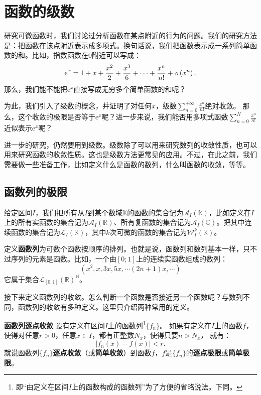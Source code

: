 \documentclass[12pt,UTF8]{ctexbook}
\begin{document}
\chapter{函数的级数}

研究可微函数时，我们讨论过分析函数在某点附近的行为的问题。我们的研究方法是：把函数在该点附近表示成多项式。换句话说，我们把函数表示成一系列简单函数的和。比如，指数函数在$0$附近可以写成：
$$\mathrm{e}^x = 1 + x + \frac{x^2}{2} + \frac{x^3}{6} + \cdots + \frac{x^n}{n!} + \mathit{o}\left(x^n\right).$$
那么，我们能不能把$\mathrm{e}^x$直接写成无穷多个简单函数的和呢？

为此，我们引入了级数的概念，并证明了对任何$x$，级数$\sum_{n=0}^{+\infty}\frac{x^{n}}{n!}$绝对收敛。
那么，这个收敛的极限是否等于$\mathrm{e}^x$呢？进一步来说，我们能否用多项式函数$\sum_{n=0}^N\frac{x^{n}}{n!}$
近似表示$\mathrm{e}^x$呢？

进一步的研究，仍然要用到级数。级数除了可以用来研究数列的收敛性质，也可以用来研究函数的收敛性质。这也是级数方法更常见的应用。不过，在此之前，我们需要做一些准备工作，比如定义什么是函数的数列，什么叫函数的收敛，等等。

\section{函数列的极限}

给定区间$I$，我们把所有从$I$到某个数域$\mathbb{K}$的函数的集合记为$\mathcal{A}_I(\mathbb{K})$，比如定义在$I$上的所有实函数的集合记为$\mathcal{A}_I(\mathbb{R})$、所有复函数的集合记为$\mathcal{A}_I(\mathbb{C})$。把其中连续函数的集合记为$\mathcal{L}_I(\mathbb{K})$，其中$k$次可微的函数的集合记为$\mathcal{W}_I^k(\mathbb{K})$。

定义\textbf{函数列}为可数个函数按顺序的排列。也就是说，函数列和数列基本一样，只不过序列的元素是函数。比如，一个由$[0;1]$上的连续实函数组成的数列：
$$ (x^2, x, 3x, 5x, \cdots (2n+1)x, \cdots )$$
它属于集合$\mathcal{L}_{[0;1]}(\mathbb{R})^{\mathbb{N}}$。

接下来定义函数列的收敛。怎么判断一个函数是否接近另一个函数呢？与数列不同，函数列的收敛有多种定义。这里只介绍两种常用的定义。
\begin{df}{\textbf{函数列逐点收敛}}
    设有定义在区间$I$上的函数列\footnote{即“由定义在区间$I$上的函数构成的函数列”为了方便的省略说法。下同。}$\{f_n\}$。
    如果有定义在$I$上的函数$f$，使得对任意$r>0$，任意$x\in I$，都有正整数$N_x$，使得只要$n>N_x$，
    就有：
    $$ |f_n(x) - f(x) | < r.$$
    就说函数列$\{f_n\}$\textbf{逐点收敛}（或\textbf{简单收敛}）到函数$f$，$f$是$\{f_n\}$的\textbf{逐点极限}或\textbf{简单极限}。
\end{df}
\end{document}

